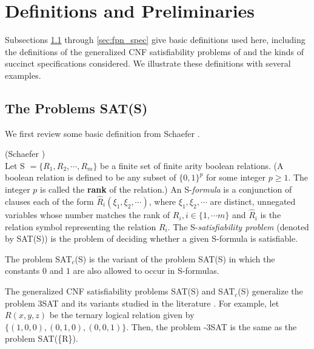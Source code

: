\section{Definitions and Preliminaries}\label{sec:def}
Subsections  \ref{sec:other_def} through \ref{sec:fpn_spec} give
 basic
definitions used here, 
including the definitions of the generalized {\sf CNF} satisfiability 
problems  of \cite{Sc78} and the kinds of 
succinct specifications considered. We illustrate these definitions with  
several examples.


\vspace*{-0.15in}
\subsection{The Problems {\sf SAT(S)}}\label{sec:other_def}
We first review some basic definition  from Schaefer \cite{Sc78}.

\begin{definition}\label{s-formulas:def}(Schaefer \cite{Sc78})\\
Let S $= \{R_1,R_2, \cdots, R_m \}$ be a finite 
set of finite arity boolean
relations. (A boolean relation is defined to be 
any subset of $\{0,1 \}^p$ for some integer $p \geq 1$. 
The integer $p$ is called the  {\bf rank} of the relation.)
An S-{\it formula} is a conjunction of clauses each of the form 
$\hat{R}_i(\xi_1, \xi_2, \cdots)$, where $\xi_1, \xi_2, \cdots$ are distinct, 
unnegated variables whose number matches the 
rank of $R_i, i \in \{ 1, \cdots m \}$ and $\hat{R}_i$ is the relation symbol
representing the relation $R_i$.
The  S-{\it satisfiability problem} (denoted by SAT(S)) 
is the problem of deciding 
whether a given S-formula is satisfiable.

The problem {\sf SAT$_c$(S)} is the variant of the problem 
{\sf SAT(S)} in which the constants $0$ and $1$ are also allowed
to occur in {\sf S-}formulas. 
\end{definition}


The 
generalized {\sf CNF} satisfiability problems {\sf SAT(S)} and 
{\sf SAT$_c$(S)} generalize  the problem  {\sf 3SAT} and its variants
studied in the literature \cite{GJ79}. For example,
let $R(x,y,z)$ be the ternary logical relation  given by
$\{(1,0,0), (0,1,0), (0,0,1) \}$. Then, the problem 
{-3SAT}  is the same as the problem {\sf SAT(\{R\})}. 

\iffalse
Similarly, {\sf NAE3SAT} is the problem of determining if
a {\sf 3CNF} formula, has a satisfying assignment in which all the literals
in any clause are not simultaneously true. 
\fi




